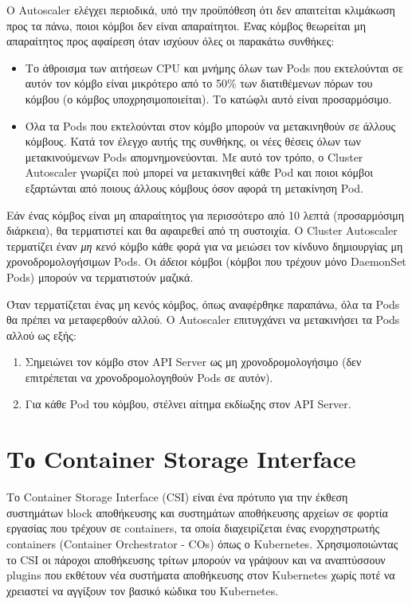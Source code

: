 Ο Autoscaler ελέγχει περιοδικά, υπό την προϋπόθεση ότι δεν απαιτείται κλιμάκωση
προς τα πάνω, ποιοι κόμβοι δεν είναι απαραίτητοι. Ένας κόμβος θεωρείται μη
απαραίτητος προς αφαίρεση όταν ισχύουν όλες οι παρακάτω συνθήκες:

\begin{itemize}
      \tightlist
      \item Το άθροισμα των αιτήσεων CPU και μνήμης όλων των Pods που
            εκτελούνται σε αυτόν τον κόμβο είναι μικρότερο από το 50\% των
            διατιθέμενων πόρων του κόμβου (ο κόμβος υποχρησιμοποιείται). Το
            κατώφλι αυτό είναι προσαρμόσιμο.
      \item Όλα τα Pods που εκτελούνται στον κόμβο μπορούν να μετακινηθούν σε
            άλλους κόμβους. Κατά τον έλεγχο αυτής της συνθήκης, οι νέες θέσεις
            όλων των μετακινούμενων Pods απομνημονεύονται. Με αυτό τον τρόπο, ο
            Cluster Autoscaler γνωρίζει πού μπορεί να μετακινηθεί κάθε Pod και
            ποιοι κόμβοι εξαρτώνται από ποιους άλλους κόμβους όσον αφορά τη
            μετακίνηση Pod.

\end{itemize}

Εάν ένας κόμβος είναι μη απαραίτητος για περισσότερο από 10 λεπτά (προσαρμόσιμη
διάρκεια), θα τερματιστεί και θα αφαιρεθεί από τη συστοιχία. Ο Cluster
Autoscaler τερματίζει έναν \textit{μη κενό} κόμβο κάθε φορά για να μειώσει τον
κίνδυνο δημιουργίας μη χρονοδρομολογήσιμων Pods. Οι \textit{άδειοι} κόμβοι
(κόμβοι που τρέχουν μόνο DaemonSet Pods) μπορούν να τερματιστούν μαζικά.

Όταν τερματίζεται ένας μη κενός κόμβος, όπως αναφέρθηκε παραπάνω, όλα τα Pods θα
πρέπει να μεταφερθούν αλλού. Ο Autoscaler επιτυγχάνει να μετακινήσει τα Pods
αλλού ως εξής:
\begin{enumerate}
      \item Σημειώνει τον κόμβο στον API Server ως μη χρονοδρομολογήσιμο (δεν
            επιτρέπεται να χρονοδρομολογηθούν Pods σε αυτόν).
      \item Για κάθε Pod του κόμβου, στέλνει αίτημα εκδίωξης στον API Server.
\end{enumerate}



\section{Το Container Storage Interface}

Το Container Storage Interface  (CSI) είναι ένα πρότυπο για την έκθεση
συστημάτων block αποθήκευσης και συστημάτων αποθήκευσης αρχείων σε φορτία
εργασίας που τρέχουν σε containers, τα οποία διαχειρίζεται ένας ενορχηστρωτής
containers (Container Orchestrator - COs) όπως ο Kubernetes. Χρησιμοποιώντας το
CSI οι πάροχοι αποθήκευσης τρίτων μπορούν να γράψουν και να αναπτύσσουν plugins
που εκθέτουν νέα συστήματα αποθήκευσης στον Kubernetes χωρίς ποτέ να χρειαστεί
να αγγίξουν τον βασικό κώδικα του Kubernetes.

